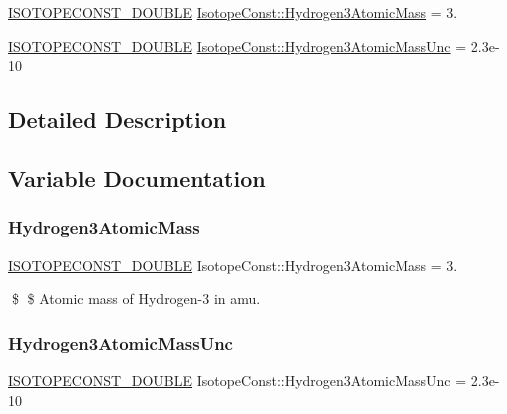 \begin{DoxyCompactItemize}
\item 
\mbox{\hyperlink{group___isotope_const-_macros_ga8f45a7272ce02c0b4c65c44636ed719a}{I\+S\+O\+T\+O\+P\+E\+C\+O\+N\+S\+T\+\_\+\+D\+O\+U\+B\+LE}} \mbox{\hyperlink{group___isotope_const-_hydrogen-_h3_ga2df1170588828cdf85f7b7164084487c}{Isotope\+Const\+::\+Hydrogen3\+Atomic\+Mass}} = 3.
\item 
\mbox{\hyperlink{group___isotope_const-_macros_ga8f45a7272ce02c0b4c65c44636ed719a}{I\+S\+O\+T\+O\+P\+E\+C\+O\+N\+S\+T\+\_\+\+D\+O\+U\+B\+LE}} \mbox{\hyperlink{group___isotope_const-_hydrogen-_h3_gaacfe58c9cdb17377f098340af96eaa5f}{Isotope\+Const\+::\+Hydrogen3\+Atomic\+Mass\+Unc}} = 2.\+3e-\/10
\end{DoxyCompactItemize}


\subsection{Detailed Description}


\subsection{Variable Documentation}
\mbox{\label{group___isotope_const-_hydrogen-_h3_ga2df1170588828cdf85f7b7164084487c}} 
\subsubsection{\texorpdfstring{Hydrogen3\+Atomic\+Mass}{Hydrogen3AtomicMass}}
{\footnotesize\ttfamily \mbox{\hyperlink{group___isotope_const-_macros_ga8f45a7272ce02c0b4c65c44636ed719a}{I\+S\+O\+T\+O\+P\+E\+C\+O\+N\+S\+T\+\_\+\+D\+O\+U\+B\+LE}} Isotope\+Const\+::\+Hydrogen3\+Atomic\+Mass = 3.}

\$ \$ Atomic mass of Hydrogen-\/3 in amu. \mbox{\label{group___isotope_const-_hydrogen-_h3_gaacfe58c9cdb17377f098340af96eaa5f}} 
\subsubsection{\texorpdfstring{Hydrogen3\+Atomic\+Mass\+Unc}{Hydrogen3AtomicMassUnc}}
{\footnotesize\ttfamily \mbox{\hyperlink{group___isotope_const-_macros_ga8f45a7272ce02c0b4c65c44636ed719a}{I\+S\+O\+T\+O\+P\+E\+C\+O\+N\+S\+T\+\_\+\+D\+O\+U\+B\+LE}} Isotope\+Const\+::\+Hydrogen3\+Atomic\+Mass\+Unc = 2.\+3e-\/10}

